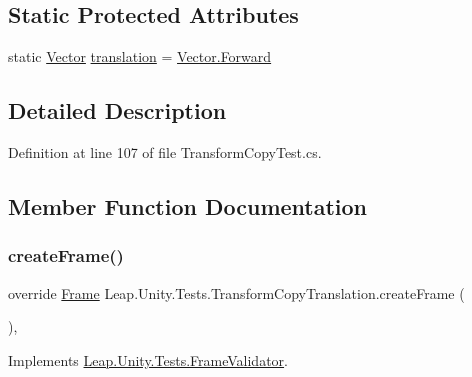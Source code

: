 \subsection*{Static Protected Attributes}
\begin{DoxyCompactItemize}
\item 
static \mbox{\hyperlink{struct_leap_1_1_vector}{Vector}} \mbox{\hyperlink{class_leap_1_1_unity_1_1_tests_1_1_transform_copy_translation_ada7696181bd158597d8bd4818f81c470}{translation}} = \mbox{\hyperlink{struct_leap_1_1_vector_a2ec88fe91f8086e18e78ee2dcc078525}{Vector.\+Forward}}
\end{DoxyCompactItemize}


\subsection{Detailed Description}


Definition at line 107 of file Transform\+Copy\+Test.\+cs.



\subsection{Member Function Documentation}
\mbox{\label{class_leap_1_1_unity_1_1_tests_1_1_transform_copy_translation_abaa9e440cd40e50c4d4e46ab6eb3fbc4}} 
\subsubsection{\texorpdfstring{createFrame()}{createFrame()}}
{\footnotesize\ttfamily override \mbox{\hyperlink{class_leap_1_1_frame}{Frame}} Leap.\+Unity.\+Tests.\+Transform\+Copy\+Translation.\+create\+Frame (\begin{DoxyParamCaption}{ }\end{DoxyParamCaption})\hspace{0.3cm}{\ttfamily [protected]}, {\ttfamily [virtual]}}



Implements \mbox{\hyperlink{class_leap_1_1_unity_1_1_tests_1_1_frame_validator_ae397067480c6fd2183160f048094e466}{Leap.\+Unity.\+Tests.\+Frame\+Validator}}.



